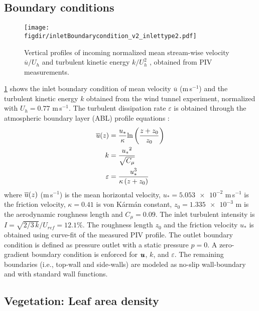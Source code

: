 \subsection{Boundary conditions}

\begin{figure}[t]
	\centering
	\texttt{[image: \\figdir/inletBoundarycondition\_v2\_inlettype2.pdf]}
	\caption{Vertical profiles of incoming normalized  mean stream-wise velocity $\overline{u}/U_h$ and   turbulent kinetic energy $k/U_h^2$ , obtained from PIV measurements.}
	\label{fig:boundaryprofile}
\end{figure}

\cref{fig:boundaryprofile} shows the inlet boundary condition of mean velocity $\overline{u}$ (m\,s$^{-1}$) and the turbulent kinetic energy $k$ obtained from the wind tunnel experiment, normalized with $U_h = 0.77$ m\,s$^{-1}$. The turbulent dissipation rate $\varepsilon$ is obtained through the atmospheric boundary layer (ABL) profile equations \citep{Richards1993}:
\begin{align}
	\overline{u}(z) &= \frac{{{u_*}}}{\kappa }{\text{ln}}\left( {\frac{{z + {z_0}}}{{{z_0}}}} \right) \\
	k &= \frac{{{u_*}^2}}{{\sqrt {{C_\mu }} }} \\
	\varepsilon  &= \frac{{u_*^3}}{{\kappa \left( {z + {z_0}} \right)}}
	\label{eq:ableq}
\end{align}
where $\overline{u}(z)$ (m\,s$^{-1}$) is the mean horizontal velocity, $u_*= \num{5.053e-2}$ m\,s$^{-1}$ is  the friction velocity, $\kappa=0.41$ is von K\'arm\'an constant, $z_0 = \num{1.335e-3}$ m is the aerodynamic roughness length and $C_{\mu}=0.09$. The inlet turbulent intensity is $\textit{I} = \sqrt{2/3\,k}/U_{ref} = 12.1 \%$. The roughness length $z_0$ and the friction velocity $u_*$ is obtained using curve-fit of the measured PIV profile. The outlet boundary condition is defined as pressure outlet with a static pressure $p=0$. A zero-gradient boundary condition is enforced for $\textbf{\textit{u}}$, $k$, and $\varepsilon$. The remaining boundaries (i.e., top-wall and side-walls) are modeled as no-slip wall-boundary and with standard wall functions.

\subsection{Vegetation: Leaf area density}

